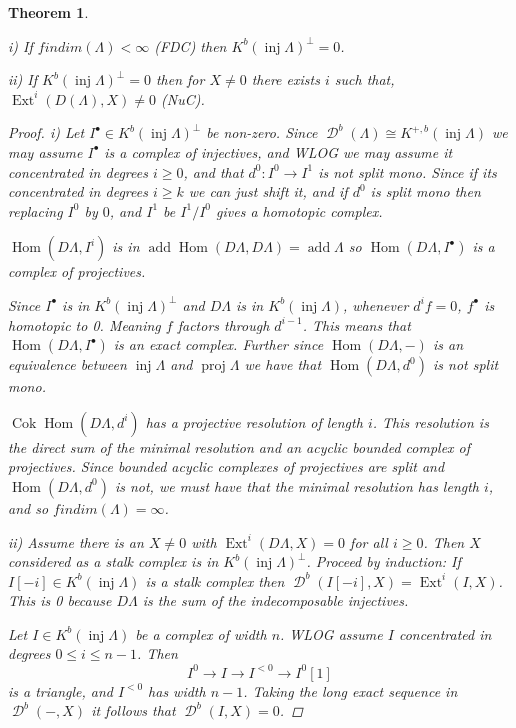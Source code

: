 \documentclass[11pt, a4paper, english]{article}
\newtheorem{theorem}{Theorem}[section]
\theoremstyle{definition}
\DeclareMathOperator{\Hom}{Hom}
\DeclareMathOperator{\Ext}{Ext}
\DeclareMathOperator{\cok}{Cok}
\DeclareMathOperator{\inj}{inj}
\DeclareMathOperator{\proj}{proj}
\DeclareMathOperator{\add}{add}
\DeclareMathOperator{\D}{\mathcal{D}}
\begin{document}
\begin{theorem} \cite[1.2]{Hap93} \label{thm:findim_implies_inj_generate}
	\item[i)] If $findim(\Lambda) < \infty$ (FDC) then $K^b(\inj\Lambda)^\perp = 0$.
	\item[ii)] If $K^b(\inj\Lambda)^\perp = 0$ then for $X\neq 0$ there exists $i$ such that, $\Ext^i(D(\Lambda), X) \neq 0$ (NuC).
	\begin{proof}
		\item[i)] Let $I^\bullet \in K^b(\inj\Lambda)^\perp$ be non-zero. Since $\D^b(\Lambda) \cong K^{+,b}(\inj\Lambda)$ we may assume $I^\bullet$ is a complex of injectives, and WLOG we may assume it concentrated in degrees $i \geq 0$, and that $d^0:I^0 \to I^1$ is not split mono. Since if its concentrated in degrees $i \geq k$ we can just shift it, and if $d^0$ is split mono then replacing $I^0$ by $0$, and $I^1$ be $I^1/I^0$ gives a homotopic complex.
		
		$\Hom(D\Lambda, I^i)$ is in $\add\Hom(D\Lambda, D\Lambda) = \add\Lambda$ so $\Hom(D\Lambda, I^\bullet)$ is a complex of projectives.
		
		
		Since $I^\bullet$ is in $K^b(\inj\Lambda)^\perp$ and $D\Lambda$ is in $K^b(\inj\Lambda)$, whenever $d^if=0$, $f^\bullet$ is homotopic to 0. Meaning $f$ factors through $d^{i-1}$. This means that $\Hom(D\Lambda, I^\bullet)$ is an exact complex. Further since $\Hom(D\Lambda, -)$ is an equivalence between $\inj\Lambda$ and $\proj\Lambda$ we have that $\Hom(D\Lambda, d^0)$ is not split mono.
		
		$\cok\Hom(D\Lambda, d^i)$ has a projective resolution of length $i$. This resolution is the direct sum of the minimal resolution and an acyclic bounded complex of projectives. Since bounded acyclic complexes of projectives are split and $\Hom(D\Lambda, d^0)$ is not, we must have that the minimal resolution has length $i$, and so $findim(\Lambda) = \infty$.
		
		\item[ii)] Assume there is an $X \neq 0$ with $\Ext^i(D\Lambda, X) = 0$ for all $i \geq 0$. Then $X$ considered as a stalk complex is in $K^b(\inj\Lambda)^\perp$. Proceed by induction: If $I[-i] \in K^b(\inj\Lambda)$ is a stalk complex then $\D^b(I[-i], X) = \Ext^i(I, X)$. This is 0 because $D\Lambda$ is the sum of the indecomposable injectives.
		
		Let $I \in K^b(\inj\Lambda)$ be a complex of width $n$. WLOG assume $I$ concentrated in degrees $0 \leq i \leq n-1$. Then $$I^0 \to I \to I^{<0} \to I^0[1]$$ is a triangle, and $I^{<0}$ has width $n-1$. Taking the long exact sequence in $\D^b(-,X)$ it follows that $\D^b(I, X)=0$.  
	\end{proof}
\end{theorem}
\end{document}
